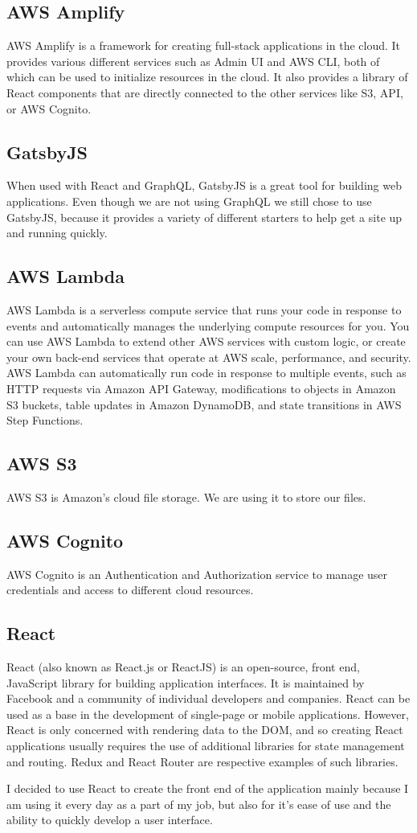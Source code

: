 \documentclass[12pt,oneside]{fithesis2}
\begin{document}
\subsection*{AWS Amplify}
AWS Amplify is a framework for creating full-stack applications in the cloud. It provides various different services such as Admin UI and AWS CLI, both of which can be used to initialize resources in the cloud. It also provides a library of React components that are directly connected to the other services like S3, API, or AWS Cognito.
\subsection*{GatsbyJS}
When used with React and GraphQL, GatsbyJS is a great tool for building web applications. Even though we are not using GraphQL we still chose to use GatsbyJS, because it provides a variety of different starters to help get a site up and running quickly.
\subsection*{AWS Lambda}
AWS Lambda is a serverless compute service that runs your code in response to events and automatically manages the underlying compute resources for you. You can use AWS Lambda to extend other AWS services with custom logic, or create your own back-end services that operate at AWS scale, performance, and security. AWS Lambda can automatically run code in response to multiple events, such as HTTP requests via Amazon API Gateway, modifications to objects in Amazon S3 buckets, table updates in Amazon DynamoDB, and state transitions in AWS Step Functions.
\subsection*{AWS S3}
AWS S3 is Amazon's cloud file storage. We are using it to store our files.
\subsection*{AWS Cognito}
AWS Cognito is an Authentication and Authorization service to manage user credentials and access to different cloud resources.
\subsection*{React}
React (also known as React.js or ReactJS) is an open-source, front end, JavaScript library for building application interfaces. It is maintained by Facebook and a community of individual developers and companies. React can be used as a base in the development of single-page or mobile applications. However, React is only concerned with rendering data to the DOM, and so creating React applications usually requires the use of additional libraries for state management and routing. Redux and React Router are respective examples of such libraries.
\par
I decided to use React to create the front end of the application mainly because I am using it every day as a part of my job, but also for it's ease of use and the ability to quickly develop a user interface.
\end{document}
